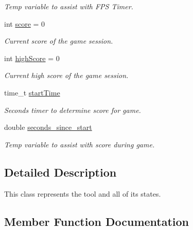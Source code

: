 \begin{DoxyCompactItemize}
\begin{DoxyCompactList}\small\item\em Temp variable to assist with F\+PS Timer. \end{DoxyCompactList}\item 
\mbox{\label{class_tool_a9a5c6e99cfec23763839f77f4224b752}} 
int \mbox{\hyperlink{class_tool_a9a5c6e99cfec23763839f77f4224b752}{score}} = 0
\begin{DoxyCompactList}\small\item\em Current score of the game session. \end{DoxyCompactList}\item 
\mbox{\label{class_tool_aec3c7c96cfc907809cc1ffa076e2a965}} 
int \mbox{\hyperlink{class_tool_aec3c7c96cfc907809cc1ffa076e2a965}{high\+Score}} = 0
\begin{DoxyCompactList}\small\item\em Current high score of the game session. \end{DoxyCompactList}\item 
\mbox{\label{class_tool_a79fcf89350a8deabf940bafc75063d60}} 
time\+\_\+t \mbox{\hyperlink{class_tool_a79fcf89350a8deabf940bafc75063d60}{start\+Time}}
\begin{DoxyCompactList}\small\item\em Seconds timer to determine score for game. \end{DoxyCompactList}\item 
\mbox{\label{class_tool_a36820fb822fa1b229727302f1ec59009}} 
double \mbox{\hyperlink{class_tool_a36820fb822fa1b229727302f1ec59009}{seconds\+\_\+since\+\_\+start}}
\begin{DoxyCompactList}\small\item\em Temp variable to assist with score during game. \end{DoxyCompactList}\end{DoxyCompactItemize}


\subsection{Detailed Description}
This class represents the tool and all of its states. 

\subsection{Member Function Documentation}
\mbox{\label{class_tool_ac6f94c15571c1b5cfe05f42d3c1f703a}} 
